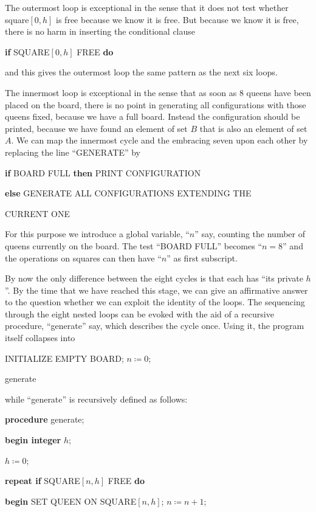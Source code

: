 The outermost loop is exceptional in the sense that it does not test whether square$[0,h]$ is free because we know it is free. But because we know it is free, there is no harm in inserting the conditional clause

\quad \textbf{if} SQUARE$[0,h]$ FREE \textbf{do}

\noindent
and this gives the outermost loop the same pattern as the next six loops.

The innermost loop is exceptional in the sense that as soon as 8 queens have been placed on the board, there is no point in generating all configurations with those queens fixed, because we have a full board. Instead the configuration should be printed, because we have found an element of set $B$ that is also an element of set $A$. We can map the innermost cycle and the embracing seven upon each other by replacing the line ``GENERATE'' by

\textbf{if} BOARD FULL \textbf{\textbf{then}} PRINT CONFIGURATION

\quad \textbf{else} GENERATE ALL CONFIGURATIONS EXTENDING THE

\quad\quad CURRENT ONE

For this purpose we introduce a global variable, ``$n$'' say, counting the number of queens currently on the board. The test ``BOARD FULL'' becomes ``$n = 8$'' and the operations on squares can then have ``$n$'' as first subscript.

By now the only difference between the eight cycles is that each has ``its private $h$''. By the time that we have reached this stage, we can give an affirmative answer to the question whether we can exploit the identity of the loops. The sequencing through the eight nested loops can be evoked with the aid of a recursive procedure, ``generate'' say, which describes the cycle once. Using it, the program itself collapses into

\quad INITIALIZE EMPTY BOARD; $n \coloneq 0$;

\quad generate

\noindent
while ``generate'' is recursively defined as follows:

\textbf{procedure} generate;

\textbf{begin integer} $h$;

$h \coloneq 0$;

\textbf{repeat if} SQUARE$[n,h]$ FREE \textbf{do}

\quad \textbf{\textbf{begin}} SET QUEEN ON SQUARE$[n,h]$; $n \coloneq n + 1$;


